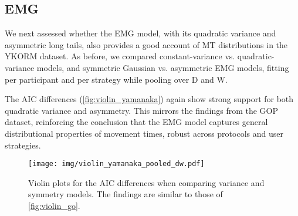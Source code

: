 \documentclass[acmlarge, manuscript,review]{acmart}
\newcommand{\ide}{\ensuremath{{\text{ID}_e}}\xspace}
\begin{document}

\subsection{EMG}
We next assessed whether the EMG model, with its quadratic variance and asymmetric long tails, also provides a good account of MT distributions in the YKORM dataset. As before, we compared constant-variance vs. quadratic-variance models, and symmetric Gaussian vs. asymmetric EMG models, fitting per participant and per strategy while pooling over D and W.

The AIC differences (\autoref{fig:violin_yamanaka}) again show strong support for both quadratic variance and asymmetry. This mirrors the findings from the GOP dataset, reinforcing the conclusion that the EMG model captures general distributional properties of movement times, robust across protocols and user strategies.

\begin{figure}[htbp]
	\centering
	\texttt{[image: img/violin\_yamanaka\_pooled\_dw.pdf]}
	\caption{Violin plots for the AIC differences when comparing variance and symmetry models. The findings are similar to those of \autoref{fig:violin_go}.}
	\label{fig:violin_yamanaka}
\end{figure}
\end{document}
